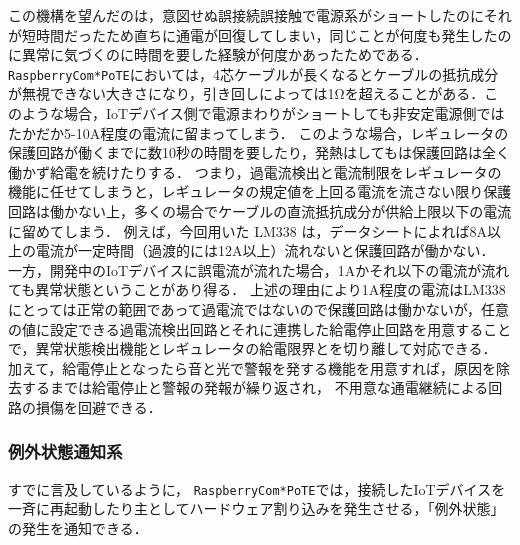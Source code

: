 この機構を望んだのは，意図せぬ誤接続誤接触で電源系がショートしたのにそれが短時間だったため直ちに通電が回復してしまい，同じことが何度も発生したのに異常に気づくのに時間を要した経験が何度かあったためである．
{\tt Raspberry\-Com*PoTE}においては，4芯ケーブルが長くなるとケーブルの抵抗成分が無視できない大きさになり，引き回しによっては1Ωを超えることがある．このような場合，IoTデバイス側で電源まわりがショートしても非安定電源側ではたかだか5-10A程度の電流に留まってしまう．
このような場合，レギュレータの保護回路が働くまでに数10秒の時間を要したり，発熱はしてもは保護回路は全く働かず給電を続けたりする．
つまり，過電流検出と電流制限をレギュレータの機能に任せてしまうと，レギュレータの規定値を上回る電流を流さない限り保護回路は働かない上，多くの場合でケーブルの直流抵抗成分が供給上限以下の電流に留めてしまう．
例えば，今回用いた LM338 は，データシートによれば8A以上の電流が一定時間（過渡的には12A以上）流れないと保護回路が働かない．
一方，開発中のIoTデバイスに誤電流が流れた場合，1Aかそれ以下の電流が流れても異常状態ということがあり得る．
上述の理由により1A程度の電流はLM338にとっては正常の範囲であって過電流ではないので保護回路は働かないが，任意の値に設定できる過電流検出回路とそれに連携した給電停止回路を用意することで，異常状態検出機能とレギュレータの給電限界とを切り離して対応できる．
加えて，給電停止となったら音と光で警報を発する機能を用意すれば，原因を除去するまでは給電停止と警報の発報が繰り返され，
不用意な通電継続による回路の損傷を回避できる．



\subsubsection{例外状態通知系}


すでに言及しているように，
{\tt Raspberry\-Com*PoTE}では，接続したIoTデバイスを一斉に再起動したり主としてハードウェア割り込みを発生させる，「例外状態」の発生を通知できる．

